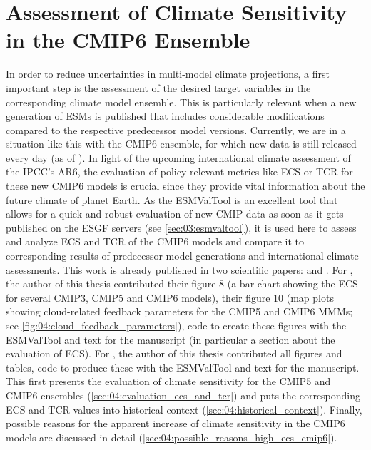 


\chapter{Assessment of Climate Sensitivity in the \acs{CMIP}6 Ensemble}
\label{ch:04:papers_ecs_tcr_assessment}

In order to reduce uncertainties in multi-model climate projections, a first
important step is the assessment of the desired target variables in the
corresponding climate model ensemble. This is particularly relevant when a new
generation of \acp{ESM} is published that includes considerable modifications
compared to the respective predecessor model versions. Currently, we are in a
situation like this with the \acs{CMIP}6 ensemble, for which new data is still
released every day (as of \TheMonth{}). In light of the upcoming international
climate assessment of the \ac{IPCC}'s \acs{AR}6, the evaluation of
policy-relevant metrics like \ac{ECS} or \ac{TCR} for these new \acs{CMIP}6
models is crucial since they provide vital information about the future climate
of planet Earth. As the \ac{ESMValTool} is an excellent tool that allows for a
quick and robust evaluation of new \ac{CMIP} data as soon as it gets published
on the \ac{ESGF} servers (see \cref{sec:03:esmvaltool}), it is used here to
assess and analyze \ac{ECS} and \ac{TCR} of the \acs{CMIP}6 models and compare
it to corresponding results of predecessor model generations and international
climate assessments. This work is already published in two scientific papers:
\textcite{Bock2020} and \textcite{Meehl2020}. For \textcite{Bock2020}, the
author of this thesis contributed their figure 8 (a bar chart showing the
\ac{ECS} for several \acs{CMIP}3, \acs{CMIP}5 and \acs{CMIP}6 models), their
figure 10 (map plots showing cloud-related feedback parameters for the
\acs{CMIP}5 and \acs{CMIP}6 \acp{MMM}; see
\cref{fig:04:cloud_feedback_parameters}), code to create these figures with the
\ac{ESMValTool} and text for the manuscript (in particular a section about the
evaluation of \ac{ECS}). For \textcite{Meehl2020}, the author of this thesis
contributed all figures and tables, code to produce these with the
\ac{ESMValTool} and text for the manuscript. This
 first presents the evaluation of
climate sensitivity for the \acs{CMIP}5 and \acs{CMIP}6 ensembles
(\cref{sec:04:evaluation_ecs_and_tcr}) and puts the corresponding \ac{ECS} and
\ac{TCR} values into historical context (\cref{sec:04:historical_context}).
Finally, possible reasons for the apparent increase of climate sensitivity in
the \acs{CMIP}6 models are discussed in detail
(\cref{sec:04:possible_reasons_high_ecs_cmip6}).


